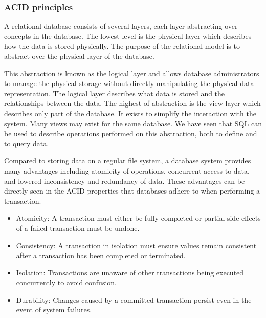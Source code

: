 \subsubsection*{ACID principles}\label{sec:ACID}

A relational database consists of several layers, each layer abstracting over concepts in the database.
The lowest level is the physical layer which describes how the data is stored physically.
The purpose of the relational model is to abstract over the physical layer of the database.

This abstraction is known as the logical layer and allows database administrators to manage the physical storage without directly manipulating the physical data representation.
The logical layer describes what data is stored and the relationships between the data.
The highest of abstraction is the view layer which describes only part of the database.
It exists to simplify the interaction with the system. Many views may exist for the same database.
\cite{DBSBook}
We have seen that SQL can be used to describe operations performed on this abstraction, both to define and to query data.

Compared to storing data on a regular file system, a database system provides many advantages including atomicity of operations, concurrent access to data, and lowered inconsistency and redundancy of data\cite{DBSBook}.
These advantages can be directly seen in the ACID properties that databases adhere to when performing a transaction\cite{DBSBook}.
\begin{itemize} \label{ACID}
    \item Atomicity: A transaction must either be fully completed or partial side-effects of a failed transaction must be undone.
    \item Consistency: A transaction in isolation must ensure values remain consistent after a transaction has been completed or terminated.
    \item Isolation: Transactions are unaware of other transactions being executed concurrently to avoid confusion.
    \item Durability: Changes caused by a committed transaction persist even in the event of system failures.
\end{itemize}

